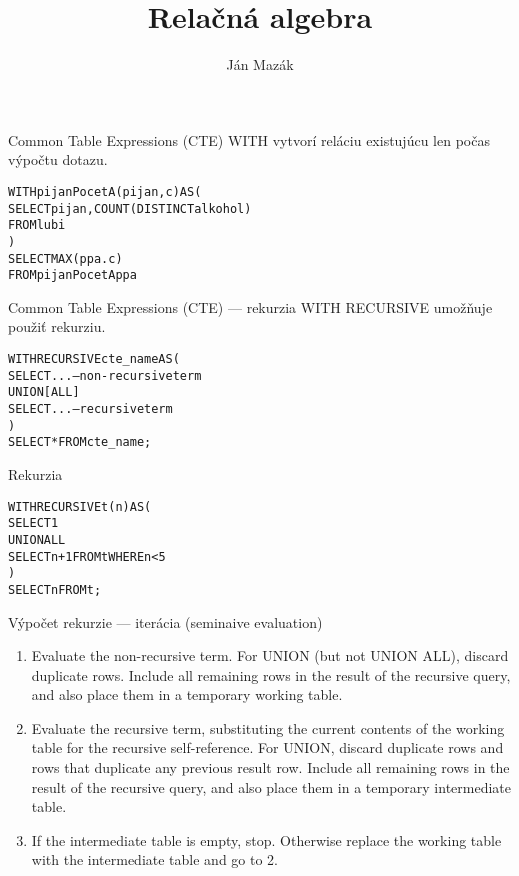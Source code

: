\documentclass[12pt]{beamer}
\title{Relačná algebra}
\author{Ján Mazák}
\institute{FMFI UK Bratislava}
\date{}
\def\blue#1{\textcolor{Cerulean}{#1}}
\begin{document}
\frame{\titlepage}

\begin{frame}[fragile]{Common Table Expressions (CTE)}
WITH vytvorí reláciu existujúcu len počas výpočtu dotazu.
\bigskip
\begin{alltt}
\alert{WITH} pijanPocetA(pijan, c) AS (
    SELECT pijan, COUNT(DISTINCT alkohol)
    FROM lubi
)
SELECT MAX(ppa.c)
FROM pijanPocetA ppa
\end{alltt}
\end{frame}

\begin{frame}[fragile]{Common Table Expressions (CTE) --- rekurzia}
WITH RECURSIVE umožňuje použiť rekurziu.
\bigskip
\begin{alltt}
\alert{WITH RECURSIVE} cte_name AS(
    SELECT ...  -- non-recursive term
  UNION [ALL]
    SELECT ...  -- recursive term
)
SELECT * FROM cte_name;
\end{alltt}
\end{frame}

\begin{frame}[fragile]{Rekurzia}
\begin{alltt}
\alert{WITH RECURSIVE} t(n) AS (
    SELECT 1
  UNION ALL
    SELECT n+1 FROM t WHERE n < 5
)
SELECT n FROM t;
\end{alltt}
\end{frame}

\begin{frame}[fragile]{Výpočet rekurzie --- iterácia (seminaive evaluation)}
\begin{enumerate}
\item Evaluate the \blue{non-recursive} term. For UNION (but not UNION ALL), discard duplicate rows.
Include all remaining rows in the result of the recursive query, and also place them in a temporary working table.

\item Evaluate the \blue{recursive} term, substituting the current contents of the working table for the recursive self-reference.
For UNION, discard duplicate rows and rows that duplicate any previous result row.
Include all remaining rows in the result of the recursive query, and also place them in a temporary intermediate table.

\item If the intermediate table is empty, stop. Otherwise replace the working table with the intermediate table and go to 2.
\end{enumerate}
\end{frame}
\end{document}
